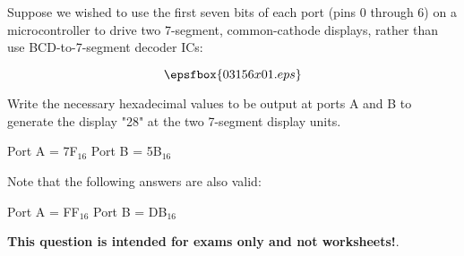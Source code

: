 

Suppose we wished to use the first seven bits of each port (pins 0 through 6) on a microcontroller to drive two 7-segment, common-cathode displays, rather than use BCD-to-7-segment decoder ICs:

$$\epsfbox{03156x01.eps}$$

Write the necessary hexadecimal values to be output at ports A and B to generate the display "28" at the two 7-segment display units.







Port A = 7F$_{16}$ \hskip 50pt Port B = 5B$_{16}$

\vskip 10pt

\noindent
Note that the following answers are also valid:

Port A = FF$_{16}$ \hskip 50pt Port B = DB$_{16}$







{\bf This question is intended for exams only and not worksheets!}.




